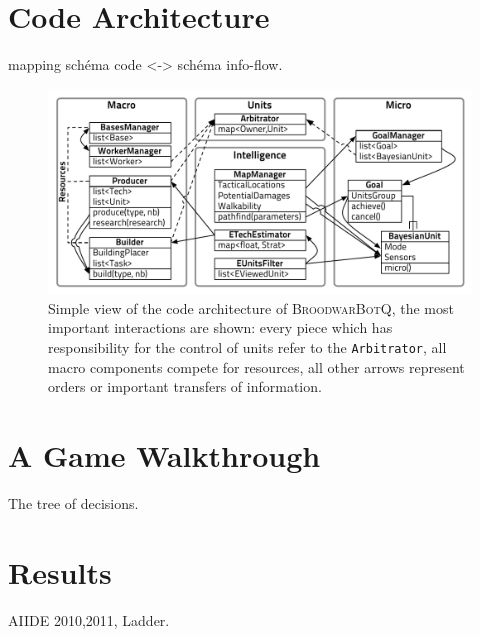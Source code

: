 \section{Code Architecture}

\label{sec:codearchitecture}
mapping schéma code <-> schéma info-flow.

\begin{figure}[h]
\begin{center}
\includegraphics[width=16cm]{images/BBQEarly2012.pdf}
\caption{Simple view of the code architecture of \textsc{BroodwarBotQ}, the most important interactions are shown: every piece which has responsibility for the control of units refer to the \texttt{Arbitrator}, all macro components compete for resources, all other arrows represent orders or important transfers of information.}
\label{fig:codearchitecture}
\end{center}
\end{figure}


\section{A Game Walkthrough}
The tree of decisions.


\section{Results}
AIIDE 2010,2011, Ladder.


